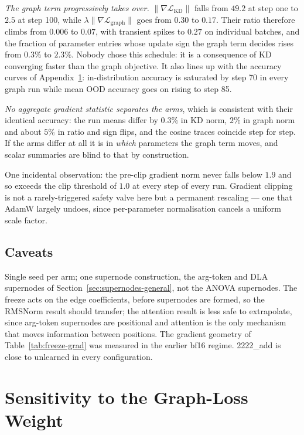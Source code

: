 \documentclass{article}
\begin{document}
\emph{The graph term progressively takes over.} $\|\nabla\mathcal{L}_{\mathrm{KD}}\|$ falls from
$49.2$ at step one to $2.5$ at step 100, while $\lambda\|\nabla\mathcal{L}_{\mathrm{graph}}\|$
goes from $0.30$ to $0.17$. Their ratio therefore climbs from $0.006$ to $0.07$, with transient
spikes to $0.27$ on individual batches, and the fraction of parameter entries whose update sign
the graph term decides rises from $0.3\%$ to $2.3\%$. Nobody chose this schedule: it is a
consequence of KD converging faster than the graph objective. It also lines up with the accuracy
curves of Appendix~\ref{app:lambda}: in-distribution accuracy is saturated by step 70 in every
graph run while mean OOD accuracy goes on rising to step 85.

\emph{No aggregate gradient statistic separates the arms}, which is consistent with their
identical accuracy: the run means differ by $0.3\%$ in KD norm, $2\%$ in graph norm and about
$5\%$ in ratio and sign flips, and the cosine traces coincide step for step. If the arms differ
at all it is in \emph{which} parameters the graph term moves, and scalar summaries are blind to
that by construction.

One incidental observation: the pre-clip gradient norm never falls below $1.9$ and so exceeds the
clip threshold of $1.0$ at every step of every run. Gradient clipping is not a rarely-triggered
safety valve here but a permanent rescaling --- one that AdamW largely undoes, since per-parameter
normalisation cancels a uniform scale factor.

\subsection{Caveats}

Single seed per arm; one supernode construction, the arg-token and DLA supernodes of
Section~\ref{sec:supernodes-general}, not the ANOVA supernodes. The freeze acts on the edge
coefficients, before supernodes are formed, so the RMSNorm result should transfer; the attention
result is less safe to extrapolate, since arg-token supernodes are positional and attention is
the only mechanism that moves information between positions. The gradient geometry of
Table~\ref{tab:freeze-grad} was measured in the earlier bf16 regime. 2222\_add is close to
unlearned in every configuration.


\section{Sensitivity to the Graph-Loss Weight}
\label{app:lambda}
\end{document}
